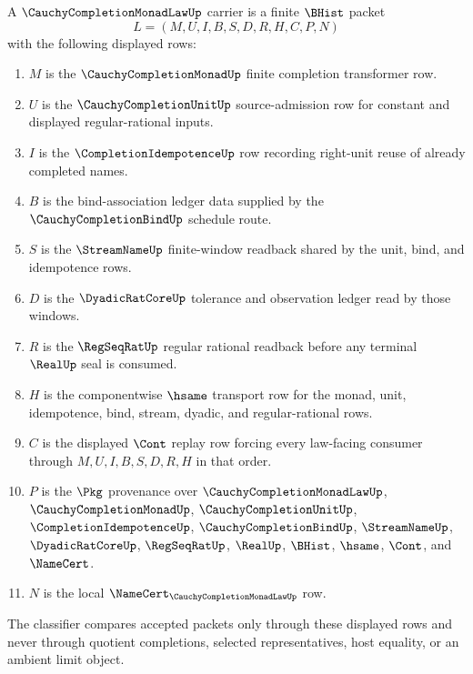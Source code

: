 \begin{definition}
\label{def:cauchy-completion-monad-law-carrier}
A $\CauchyCompletionMonadLawUp$ carrier is a finite $\BHist$ packet
$$
L=(M,U,I,B,S,D,R,H,C,P,N)
$$
with the following displayed rows:
\begin{enumerate}
\item $M$ is the $\CauchyCompletionMonadUp$ finite completion transformer row.
\item $U$ is the $\CauchyCompletionUnitUp$ source-admission row for constant and displayed regular-rational inputs.
\item $I$ is the $\CompletionIdempotenceUp$ row recording right-unit reuse of already completed names.
\item $B$ is the bind-association ledger data supplied by the $\CauchyCompletionBindUp$ schedule route.
\item $S$ is the $\StreamNameUp$ finite-window readback shared by the unit, bind, and idempotence rows.
\item $D$ is the $\DyadicRatCoreUp$ tolerance and observation ledger read by those windows.
\item $R$ is the $\RegSeqRatUp$ regular rational readback before any terminal $\RealUp$ seal is consumed.
\item $H$ is the componentwise $\hsame$ transport row for the monad, unit, idempotence, bind, stream, dyadic, and regular-rational rows.
\item $C$ is the displayed $\Cont$ replay row forcing every law-facing consumer through $M,U,I,B,S,D,R,H$ in that order.
\item $P$ is the $\Pkg$ provenance over $\CauchyCompletionMonadLawUp$, $\CauchyCompletionMonadUp$, $\CauchyCompletionUnitUp$, $\CompletionIdempotenceUp$, $\CauchyCompletionBindUp$, $\StreamNameUp$, $\DyadicRatCoreUp$, $\RegSeqRatUp$, $\RealUp$, $\BHist$, $\hsame$, $\Cont$, and $\NameCert$.
\item $N$ is the local $\NameCert_{\CauchyCompletionMonadLawUp}$ row.
\end{enumerate}
The classifier compares accepted packets only through these displayed rows and never through quotient completions, selected representatives, host equality, or an ambient limit object.
\end{definition}

